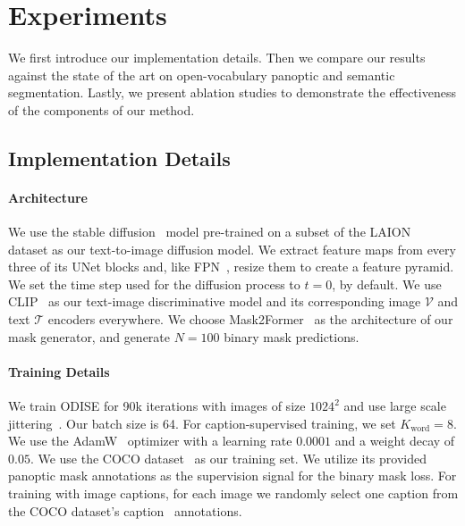\documentclass[10pt,twocolumn,letterpaper]{article}
\newcommand{\ourmethod}{ODISE}
\begin{document}
\section{Experiments}

We first introduce our implementation details. Then we compare our results against the state of the art on open-vocabulary panoptic and semantic segmentation.
Lastly, we present ablation studies to demonstrate the effectiveness of the components of our method.


\subsection{Implementation Details}

\paragraph{Architecture}
We use the stable diffusion~\cite{rombach2022ldm} model pre-trained on a subset of the LAION~\cite{schuhmann2021laion} dataset as our text-to-image diffusion model. 
We extract feature maps from every three of its UNet blocks and, like FPN~\cite{lin2017fpn}, resize them to create a feature pyramid.
We set the time step used for the diffusion process to $t=0$, by default. 
We use CLIP~\cite{radford2021clip} as our text-image discriminative model and its corresponding image $\mathcal{V}$ and text $\mathcal{T}$ encoders everywhere. 
We choose Mask2Former~\cite{cheng2022mask2former} as the architecture of our mask generator, and generate $N=100$ binary mask predictions.

\paragraph{Training Details}
We train \ourmethod{} for 90k iterations with images of size $1024^2$ and use large scale jittering~\cite{ghiasi2021simple}.
Our batch size is 64. 
For caption-supervised training, we set $K_\text{word} = 8$.
We use the AdamW~\cite{loshchilov2017decoupled} optimizer with a learning rate $0.0001$ and a weight decay of $0.05$. 
We use the COCO dataset~\cite{lin2014coco} as our training set. 
We utilize its provided panoptic mask annotations as the supervision signal for the binary mask loss.
For training with image captions, for each image we randomly select one caption from the COCO dataset's caption~\cite{chen2015cococap} annotations. 
\end{document}
